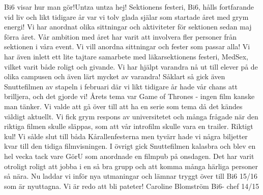 \begin{news}{4}{Bi6 visar hur man gör!}{Untza untza hej!}{}{}
Sektionens festeri, Bi6, hålls fortfarande vid liv och likt tidigare år var 
vi tolv glada själar som startade året med grym energi! Vi har anordnat olika 
sittningar och aktiviteter för sektionen sedan maj förra året. Vår ambition med 
året har varit att involvera fler personer från sektionen i våra event. Vi vill 
anordna sittningar och fester som passar alla! Vi har även inlett ett lite 
tajtare samarbete med läkarsektionens festeri, MedSex, vilket varit både roligt 
och givande. Vi har hjälpt varandra nå ut till elever på de olika campusen och 
även lärt mycket av varandra! Såklart så gick även Snuttefilmen av stapeln i 
februari där vi likt tidigare år hade vår chans att brilljera, och det gjorde 
vi! Årets tema var Game of Thrones - ingen film kanske man tänker. Vi valde att 
gå över till att ha en serie som tema då det kändes väldigt aktuellt. Vi fick 
grym respons av universitetet och många frågade när den riktiga filmen skulle 
släppas, som att vår introfilm skulle vara en trailer. Riktigt kul! Vi sålde 
slut till båda Kårallenfesterna men tyvärr hade vi några biljetter kvar till 
den tidiga filmvisningen. I övrigt gick Snuttefilmen kalasbra och blev en hel 
vecka tack vare GörU som anordnade en filmpub på onsdagen. Det har varit 
otroligt roligt att jobba i en så bra grupp och att komma många härliga 
personer så nära. Nu laddar vi inför nya utmaningar och lämnar tryggt över till 
Bi6 15/16 som är nyuttagna. Vi är redo att bli pateter! Caroline Blomström Bi6-
chef 14/15
\end{news}